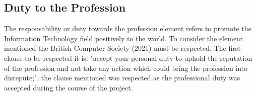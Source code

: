 \subsection{Duty to the Profession}

The responsability or duty towards the profession element refers to promote the Information
Technology field positively to the world. To consider the element mentioned the British
Computer Society (2021) must be respected. The first clause to be respected it is:
"accept your personal duty to uphold the reputation of the profession and not take
any action which could bring the profession into disrepute;", the clause mentioned was
respected as the professional duty was accepted during the course of the project.